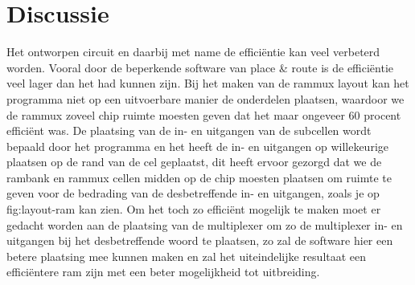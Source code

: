 \documentclass{scrartcl}  %
\begin{document}
\section{Discussie}
Het ontworpen circuit en daarbij met name de efficiëntie kan veel verbeterd worden. 
Vooral door de beperkende software van place \& route is de efficiëntie veel lager dan het had kunnen zijn. 
Bij het maken van de rammux layout kan het programma niet op een uitvoerbare manier de onderdelen plaatsen, waardoor we de rammux zoveel chip ruimte moesten geven dat het maar ongeveer 60 procent efficiënt was.
De plaatsing van de in- en uitgangen van de subcellen wordt bepaald door het programma en het heeft de in- en uitgangen op willekeurige plaatsen op de rand van de cel geplaatst, dit heeft ervoor gezorgd dat we de rambank en rammux cellen midden op de chip moesten plaatsen om ruimte te geven voor de bedrading van de desbetreffende in- en uitgangen, zoals je op fig:layout-ram kan zien.
Om het toch zo efficiënt mogelijk te maken moet er gedacht worden aan de plaatsing van de multiplexer om zo de multiplexer in- en uitgangen bij het desbetreffende woord te plaatsen, zo zal de software hier een betere plaatsing mee kunnen maken en zal het uiteindelijke resultaat een efficiëntere ram zijn met een beter mogelijkheid tot uitbreiding. 
\end{document}
